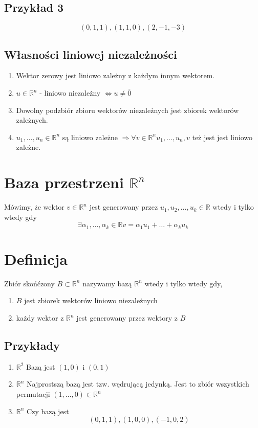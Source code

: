 \documentclass[11pt]{article}
\begin{document}
\subsection{Przykład 3}
$$(0,1,1),(1,1,0),(2,-1,-3)$$

\subsection{Własności liniowej niezależności}
\begin{enumerate}
\item{Wektor zerowy jest liniowo zależny z każdym innym wektorem.}
\item{$u\in \mathbb{R}^n$ - liniowo niezależny $\iff u \not = \overline{0}$}
\item{Dowolny podzbiór zbioru wektorów niezależnych jest zbiorek wektorów zależnych.}
\item{$u_1,\ldots,u_n \in \mathbb{R}^n$ są liniowo zależne $\Longrightarrow \forall v \in \mathbb{R}^n u_1,\ldots,u_n,v$ też jest jest liniowo zależne.}
\end{enumerate}
\section{Baza przestrzeni $\mathbb{R}^n$}
Mówimy, że wektor $ v \in \mathbb{R}^n$ jest generowany przez $u_1,u_2,\ldots,u_k \in \mathbb{R}$ wtedy i tylko wtedy gdy $$\exists \alpha_1,\ldots,\alpha_k \in \mathbb{R} v = \alpha_1 u_1 + \ldots + \alpha_k u_k$$
\section{Definicja}
Zbiór skońćzony $B \subset \mathbb{R}^n$ nazywamy bazą $\mathbb{R}^n$ wtedy i tylko wtedy gdy,
\begin{enumerate}
\item{$B$ jest zbiorek wektorów liniowo niezależnych}
\item{każdy wektor z $\mathbb{R}^n$ jest generowany przez wektory z $B$}
\end{enumerate}
\subsection{Przykłady}
\begin{enumerate}
\item{$\mathbb{R}^2$}
Bazą jest $(1,0)$ i $(0,1)$
\item{$\mathbb{R}^n$}
Najprostszą bazą jest tzw. wędrującą jedynką.
Jest to zbiór wszystkich permutacji
$(1,\ldots,0) \in \mathbb{R}^n$
\item{$\mathbb{R}^n$}
Czy bazą jest $$(0,1,1), (1,0,0) , (-1,0,2)$$
\end{enumerate}
\end{document}
